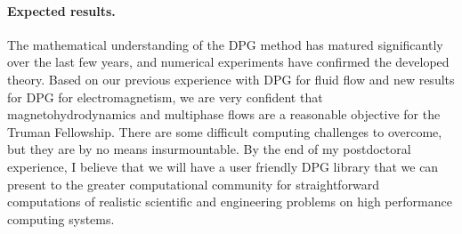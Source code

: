 \documentclass[letterpaper,12pt]{article}
\begin{document}
\paragraph{Expected results.}
The mathematical understanding of the DPG method has matured significantly over the last few years, 
and numerical experiments have confirmed the developed theory.
Based on our previous experience with DPG for fluid flow and new results for DPG for electromagnetism, we are very confident
that magnetohydrodynamics and multiphase flows are a reasonable objective for the Truman Fellowship.
There are some difficult computing challenges to overcome, but they are by no means insurmountable.
By the end of my postdoctoral experience, I believe that we will have a user friendly DPG library that we can present to the greater 
computational community for straightforward computations of realistic scientific and engineering problems on high performance computing systems.


 

\end{document}
